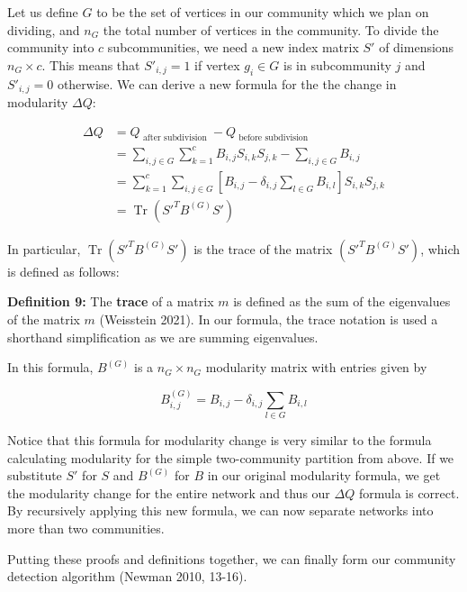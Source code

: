 \documentclass{article}
\DeclareMathOperator{\Tr}{Tr}
\begin{document}
\bigskip 

Let us define $G$ to be the set of vertices in our community which we plan on dividing, and $n_G$ the total number of vertices in the community.
To divide the community into $c$ subcommunities, we need a new index matrix $S'$ of dimensions $n_G \times c$.
This means that $S'_{i,j} = 1$ if vertex $g_i \in G$ is in subcommunity $j$ and $S'_{i,j} = 0$ otherwise. 
We can derive a new formula for the the change in modularity $\Delta Q$:

\begin{equation} \label{eq1}
\begin{split}
\Delta Q & = Q_\text{ after subdivision } - Q_\text{ before subdivision } \\
& = \sum_{i, j \in G} \sum_{k=1}^{c} B_{i,j} S_{i,k} S_{j, k} - \sum_{i, j \in G} B_{i,j} \\
 & = \sum_{k=1}^{c} \sum_{i, j \in G} [ B_{i, j} - \delta_{i, j} \sum_{l \in G} B_{i,l}]S_{i,k} S_{j, k} \\
 & = \Tr (S'^TB^{(G)}S')
\end{split}
\end{equation}

\bigskip

In particular, $\Tr (S'^TB^{(G)}S')$ is the trace of the matrix $(S'^TB^{(G)}S')$, which is defined as follows:

\bigskip 

\textbf{Definition 9:} The \textbf{trace} of a matrix $m$ is defined as the sum of the eigenvalues of the matrix $m$ (Weisstein 2021). In our formula, the trace notation is used a shorthand simplification as we are summing eigenvalues.

\bigskip

\noindent In this formula, $B^{(G)}$ is a $n_G \times n_G$ modularity matrix with entries given by

$$ B^{(G)}_{i, j} = B_{i,j} - \delta_{i, j} \sum_{l \in G} B_{i,l}$$

Notice that this formula for modularity change is very similar to the formula calculating modularity for the simple two-community partition from above.
If we substitute $S'$ for $S$ and $B^{(G)}$ for $B$ in our original modularity formula, we get the modularity change for the entire network and thus our $\Delta Q$ formula is correct.
By recursively applying this new formula, we can now separate networks into more than two communities.

\bigskip

Putting these proofs and definitions together, we can finally form our community detection algorithm (Newman 2010, 13-16).
\end{document}
